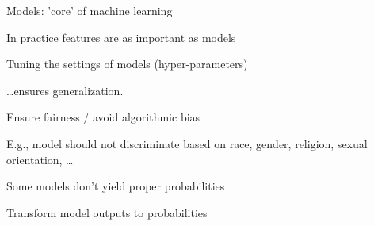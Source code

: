 \documentclass[landscape, a4paper]{article}
\begin{document}
\begin{minipage}[t]{0.2\linewidth}
\begin{betterlist}
\begin{betterlist}
		\end{betterlist}
		\item {}
		\begin{betterlist}
			\item Models: 'core' of machine learning
			\item \alert{In practice} features are as important as models
		\end{betterlist}
		\item {}
		\begin{betterlist}
			\item Tuning the settings of models (hyper-parameters)
			\item \ldots ensures generalization.
		\end{betterlist}
		\item {}
		\begin{betterlist}
			\item Ensure \alert{fairness} / avoid algorithmic bias
			\begin{betterlist}
				\item E.g., model should not discriminate based on race, gender, religion, sexual orientation, \ldots
			\end{betterlist}
			\item Some models don’t yield proper probabilities
			\begin{betterlist}
				\item Transform model outputs to probabilities
			\end{betterlist}
		\end{betterlist}
	\end{betterlist}
\end{minipage}
\end{document}
